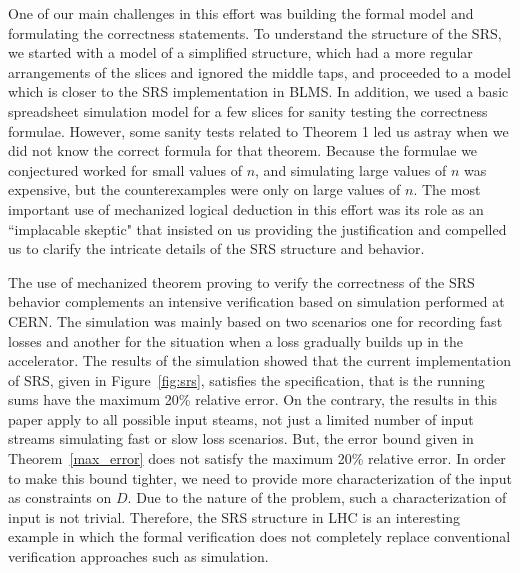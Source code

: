 \documentclass{llncs}
\begin{document}
One of our main challenges in this effort was building the formal model and formulating the correctness statements.
To understand the structure of the SRS, we started with a model of a simplified structure, which had a more regular arrangements of the slices and ignored the middle taps, and proceeded to a model which is closer to the SRS implementation in BLMS.
In addition, we used a basic spreadsheet simulation model for a few slices for sanity testing the correctness formulae.
However, some sanity tests related to Theorem 1 led us astray when we did not know the correct formula for that theorem.
Because the formulae we conjectured worked for small values of $n$, and simulating large values of $n$ was expensive, but the counterexamples were only on large values of $n$.
The most important use of mechanized logical deduction in this effort was its role as an ``implacable skeptic" that insisted on us providing the justification and compelled us to clarify the intricate details of the SRS structure and behavior.

The use of mechanized theorem proving to verify the correctness of the SRS behavior complements an intensive verification based on simulation performed at CERN.
The simulation was mainly based on two scenarios one for recording fast losses and  another for the situation when a loss gradually builds up in the accelerator.
The results of the simulation showed that the current implementation of SRS, given in Figure~\ref{fig:srs}, satisfies the specification, that is the running sums have  the maximum 20\% relative error.
On the contrary, the results in this paper apply to all possible input steams, not just a limited number of input streams simulating fast or slow loss scenarios.
But, the error bound given in Theorem~\ref{max_error} does not satisfy the maximum 20\% relative error.
In order to make this bound tighter, we need to provide more characterization of the input as constraints on $D$.
Due to the nature of the problem, such a characterization of input is not trivial.
Therefore, the SRS structure in LHC is an interesting example in which the formal verification does not completely replace conventional verification approaches such as simulation.





\end{document}
